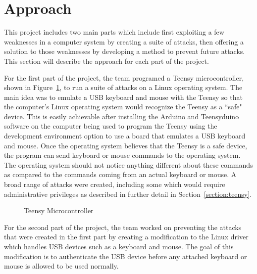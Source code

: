 \documentclass[pagenumbers]{ieee}
\begin{document}
\section{Approach}

This project includes two main parts which include first exploiting a few weaknesses in a computer system by creating a suite of attacks, then offering a solution to those weaknesses by developing a method to prevent future attacks. This section will describe the approach for each part of the project.

For the first part of the project, the team programed a Teensy microcontroller, shown in Figure~\ref{fig:Teensy}, to run a suite of attacks on a Linux operating system. The main idea was to emulate a USB keyboard and mouse with the Teensy so that the computer's Linux operating system would recognize the Teensy as a ``safe" device. This is easily achievable after installing the Arduino and Teensyduino software on the computer being used to program the Teensy using the development environment option to use a board that emulates a USB keyboard and mouse. Once the operating system believes that the Teensy is a safe device, the program can send keyboard or mouse commands to the operating system. The operating system should not notice anything different about these commands as compared to the commands coming from an actual keyboard or mouse. A broad range of attacks were created, including some which would require administrative privileges as described in further detail in Section~\ref{section:teensy}.

\begin{figure}[H]
   \caption{Teensy Microcontroller}
   \label{fig:Teensy}
\end{figure}

For the second part of the project, the team worked on preventing the attacks that were created in the first part by creating a modification to the Linux driver which handles USB devices such as a keyboard and mouse. The goal of this modification is to authenticate the USB device before any attached keyboard or mouse is allowed to be used normally.
\end{document}
